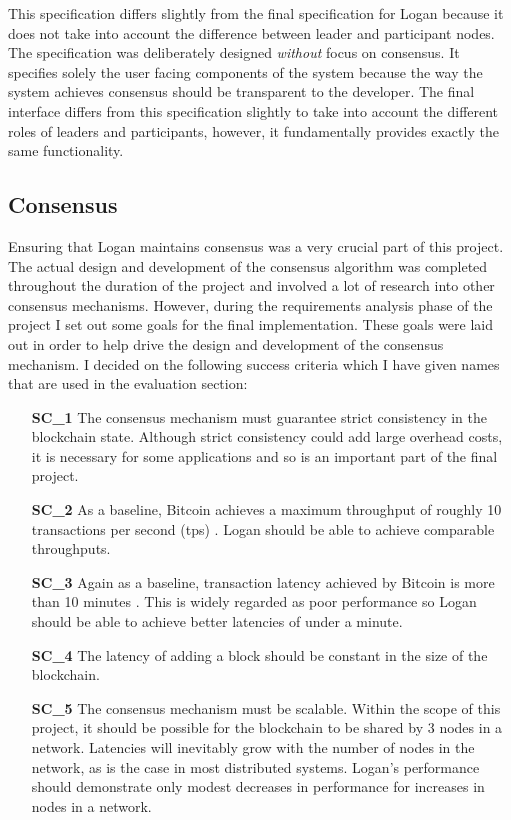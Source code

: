 \documentclass[12pt,a4paper,twoside,openright]{report}
\begin{document}
	This specification differs slightly from the final specification for Logan because it does not take into account the difference between leader and participant nodes.
	The specification was deliberately designed \textit{without} focus on consensus.
	It specifies solely the user facing components of the system because the way the system achieves consensus should be transparent to the developer.
	The final interface differs from this specification slightly to take into account the different roles of leaders and participants, however, it fundamentally provides exactly the same functionality.

	\subsection{Consensus}\label{Consensus Requirements}
	Ensuring that Logan maintains consensus was a very crucial part of this project. 
	The actual design and development of the consensus algorithm was completed throughout the duration of the project and involved a lot of research into other consensus mechanisms.
	However, during the requirements analysis phase of the project I set out some goals for the final implementation.
	These goals were laid out in order to help drive the design and development of the consensus mechanism. 
	I decided on the following success criteria which I have given names that are used in the evaluation section:
	\begin{itemize}
		\setlength{\itemindent}{2em}
		\item[\textbf{SC\_1}]The consensus mechanism must guarantee strict consistency in the blockchain state. 
		Although strict consistency could add large overhead costs, it is necessary for some applications and so is an important part of the final project.
		\item[\textbf{SC\_2}] As a baseline, Bitcoin achieves a maximum throughput of roughly 10 transactions per second (tps) \parencite{ScalingBitcoin}.
		Logan should be able to achieve comparable throughputs.
		\item[\textbf{SC\_3}] Again as a baseline, transaction latency achieved by Bitcoin is more than 10 minutes \parencite{ScalingBitcoin}.
		This is widely regarded as poor performance so Logan should be able to achieve better latencies of under a minute.
		\item[\textbf{SC\_4}] The latency of adding a block should be constant in the size of the blockchain.
		\item[\textbf{SC\_5}] The consensus mechanism must be scalable. 
		Within the scope of this project, it should be possible for the blockchain to be shared by 3 nodes in a network. 
		Latencies will inevitably grow with the number of nodes in the network, as is the case in most distributed systems.
		Logan's performance should demonstrate only modest decreases in performance for increases in nodes in a network.
	\end{itemize}
\end{document}
